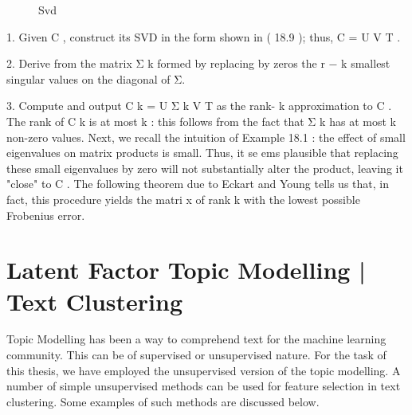 \begin{figure}[H]
    {\par}
    \caption{Svd}
\end{figure}


1. Given C , construct its SVD in the form shown in ( 18.9 ); thus, C = U \Sigma V T .

2. Derive from  the matrix Σ k formed by replacing by zeros the r − k smallest singular values on the diagonal of Σ.

3. Compute and output C k = U Σ k V T as the rank- k approximation to C . The rank of C k is at most k :  this follows from the fact that Σ k has at most k non-zero values.  Next, we recall the intuition of Example 18.1 :  the effect of small eigenvalues on matrix products is small.  Thus, it se ems plausible that replacing these small eigenvalues by zero will not substantially alter the product, leaving it "close" to C .  The following theorem due to Eckart and Young tells us that, in fact, this procedure yields the matri x of rank k with the lowest possible Frobenius error.

\section{Latent Factor Topic Modelling | Text Clustering}

Topic Modelling has been a way to comprehend text for the machine learning community. This can be of supervised or unsupervised nature. For the task of this thesis, we have employed the unsupervised version of the topic modelling. A number of simple unsupervised methods can be used for feature selection in text clustering. Some examples of such methods are discussed below.

